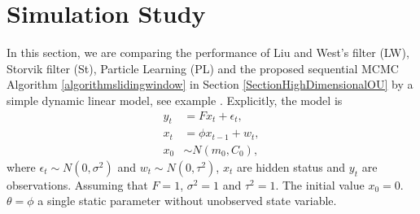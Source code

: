\section{Simulation Study}\label{sectionFilterreviewSimulation}



In this section, we are comparing the performance of Liu and West's filter (LW), Storvik filter (St), Particle Learning (PL) and the proposed sequential MCMC Algorithm \ref{algorithmslidingwindow} in Section \ref{SectionHighDimensionalOU} by a simple dynamic linear model, see example \cite{liu2001combined}. Explicitly, the model is 
\begin{align*}
y_t&=F x_t+\epsilon_t,\\
x_t&=\phi x_{t-1}+w_t,\\
x_0&\sim N(m_0,C_0),
\end{align*}
where $\epsilon_t\sim N(0,\sigma^2)$ and $w_t\sim N(0,\tau^2)$, $x_t$ are hidden status and $y_t$ are observations. Assuming that $F=1$, $\sigma^2=1$ and $\tau^2=1$. The initial value $x_0=0$. $\theta = \phi$ a single static parameter without unobserved state variable. 

